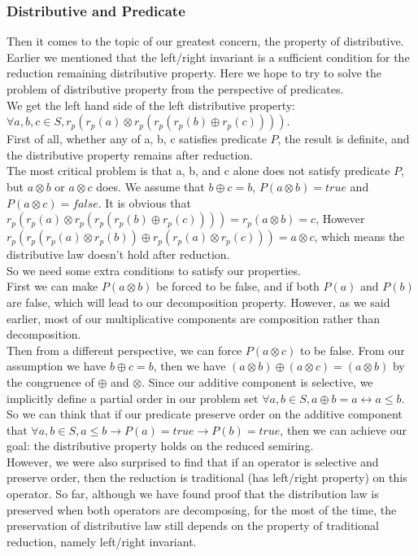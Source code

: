 \documentclass[a4paper,10pt]{article}
\begin{document}
\subsubsection{Distributive and Predicate}
Then it comes to the topic of our greatest concern, the property of distributive. Earlier we mentioned that the left/right invariant is a sufficient condition for the reduction remaining distributive property. Here we hope to try to solve the problem of distributive property from the perspective of predicates.\\
We get the left hand side of the left distributive property: $\forall a,b,c \in S, r_p(r_p(a) \otimes r_p(r_p(r_p(b) \oplus r_p(c))))$. \\
First of all, whether any of a, b, c satisfies predicate $P$, the result is definite, and the distributive property remains after reduction.\\
The most critical problem is that a, b, and c alone does not satisfy predicate $P$, but $a \otimes b$ or $a \otimes c$ does. We assume that $b \oplus c = b$, $P(a \otimes b) = true$ and $P(a \otimes c) = false$. It is obvious that $r_p(r_p(a) \otimes r_p(r_p(r_p(b) \oplus r_p(c)))) = r_p(a \otimes b) = c$, However $r_p(r_p(r_p(a) \otimes r_p(b)) \oplus r_p(r_p(a) \otimes r_p(c))) = a \otimes c$, which means the distributive law doesn't hold after reduction.\\
So we need some extra conditions to satisfy our properties.\\
First we can make $P(a \otimes b)$ be forced to be false, and if both $P(a)$ and $P(b)$ are false, which will lead to our decomposition property. However, as we said earlier, most of our multiplicative components are composition rather than decomposition.\\
Then from a different perspective, we can force $P(a\otimes c)$ to be false. From our assumption we have $b \oplus c = b$, then we have $(a \otimes b) \oplus (a \otimes c) = (a \otimes b)$ by the congruence of $\oplus$ and $\otimes$. 
Since our additive component is selective, we implicitly define a partial order in our problem set $\forall a,b \in S, a \oplus b = a \longleftrightarrow a \leq b$. 
So we can think that if our predicate preserve order on the additive component that $\forall a,b \in S, a \leq b \rightarrow P(a) = true \rightarrow P(b) = true$, then we can achieve our goal: the distributive property holds on the reduced semiring.\\
However, we were also surprised to find that if an operator is selective and preserve order, then the reduction is traditional (has left/right property) on this operator.
So far, although we have found proof that the distribution law is preserved when both operators are decomposing, for the most of the time, the preservation of distributive law still depends on the property of traditional reduction, namely left/right invariant.\\\\
\end{document}
